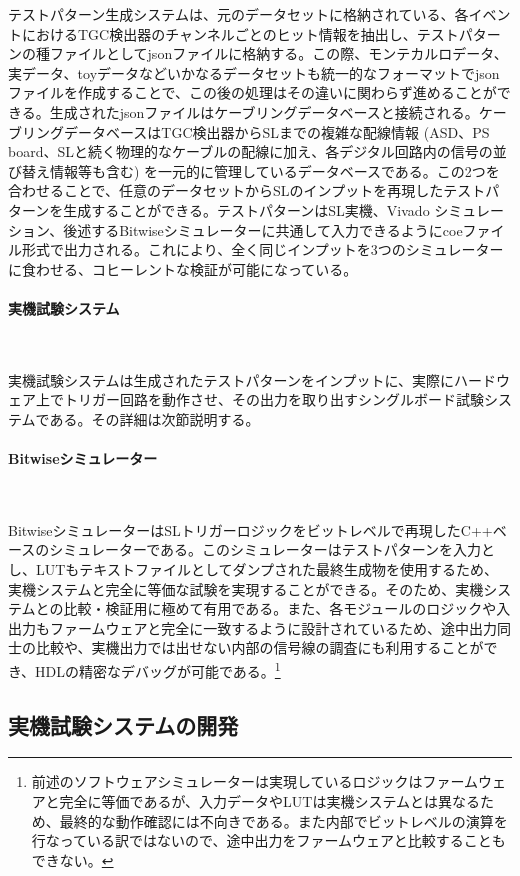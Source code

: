 テストパターン生成システムは、元のデータセットに格納されている、各イベントにおけるTGC検出器のチャンネルごとのヒット情報を抽出し、テストパターンの種ファイルとしてjsonファイルに格納する。この際、モンテカルロデータ、実データ、toyデータなどいかなるデータセットも統一的なフォーマットでjsonファイルを作成することで、この後の処理はその違いに関わらず進めることができる。生成されたjsonファイルはケーブリングデータベースと接続される。ケーブリングデータベースはTGC検出器からSLまでの複雑な配線情報 (ASD、PS board、SLと続く物理的なケーブルの配線に加え、各デジタル回路内の信号の並び替え情報等も含む) を一元的に管理しているデータベースである。この2つを合わせることで、任意のデータセットからSLのインプットを再現したテストパターンを生成することができる。テストパターンはSL実機、Vivado シミュレーション、後述するBitwiseシミュレーターに共通して入力できるようにcoeファイル形式で出力される。これにより、全く同じインプットを3つのシミュレーターに食わせる、コヒーレントな検証が可能になっている。

\paragraph{実機試験システム}　　
\par
実機試験システムは生成されたテストパターンをインプットに、実際にハードウェア上でトリガー回路を動作させ、その出力を取り出すシングルボード試験システムである。その詳細は次節説明する。

\paragraph{Bitwiseシミュレーター}　　
\par
BitwiseシミュレーターはSLトリガーロジックをビットレベルで再現したC++ベースのシミュレーターである。このシミュレーターはテストパターンを入力とし、LUTもテキストファイルとしてダンプされた最終生成物を使用するため、実機システムと完全に等価な試験を実現することができる。そのため、実機システムとの比較・検証用に極めて有用である。また、各モジュールのロジックや入出力もファームウェアと完全に一致するように設計されているため、途中出力同士の比較や、実機出力では出せない内部の信号線の調査にも利用することができ、HDLの精密なデバッグが可能である。\footnote{前述のソフトウェアシミュレーターは実現しているロジックはファームウェアと完全に等価であるが、入力データやLUTは実機システムとは異なるため、最終的な動作確認には不向きである。また内部でビットレベルの演算を行なっている訳ではないので、途中出力をファームウェアと比較することもできない。}

\subsection{実機試験システムの開発}
